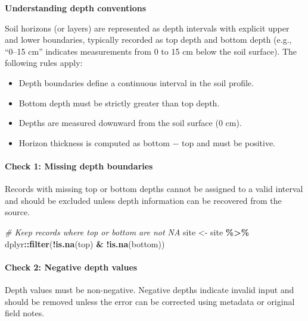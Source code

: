 \documentclass[
  10pt,
  b5paper,
  oneside]{book}
\newenvironment{Shaded}{\begin{snugshade}}{\end{snugshade}}
\newcommand{\CommentTok}[1]{\textcolor[rgb]{0.56,0.35,0.01}{\textit{#1}}}
\newcommand{\FunctionTok}[1]{\textcolor[rgb]{0.13,0.29,0.53}{\textbf{#1}}}
\newcommand{\NormalTok}[1]{#1}
\newcommand{\OtherTok}[1]{\textcolor[rgb]{0.56,0.35,0.01}{#1}}
\newcommand{\SpecialCharTok}[1]{\textcolor[rgb]{0.81,0.36,0.00}{\textbf{#1}}}
\begin{document}
\textbf{Understanding depth conventions}

Soil horizons (or layers) are represented as depth intervals with explicit upper and lower boundaries, typically recorded as top depth and bottom depth (e.g., ``0--15 cm'' indicates measurements from 0 to 15 cm below the soil surface). The following rules apply:

\begin{itemize}
\item
  Depth boundaries define a continuous interval in the soil profile.
\item
  Bottom depth must be strictly greater than top depth.
\item
  Depths are measured downward from the soil surface (0 cm).
\item
  Horizon thickness is computed as bottom − top and must be positive.
\end{itemize}

\paragraph*{Check 1: Missing depth boundaries}\label{check-1-missing-depth-boundaries}

Records with missing top or bottom depths cannot be assigned to a valid interval and should be excluded unless depth information can be recovered from the source.

\begin{Shaded}
\begin{Highlighting}[]
\CommentTok{\# Keep records where \textasciigrave{}top\textasciigrave{} or \textasciigrave{}bottom\textasciigrave{} are not NA}
\NormalTok{site }\OtherTok{\textless{}{-}}\NormalTok{ site }\SpecialCharTok{\%\textgreater{}\%}
\NormalTok{  dplyr}\SpecialCharTok{::}\FunctionTok{filter}\NormalTok{(}\SpecialCharTok{!}\FunctionTok{is.na}\NormalTok{(top) }\SpecialCharTok{\&} \SpecialCharTok{!}\FunctionTok{is.na}\NormalTok{(bottom))}
\end{Highlighting}
\end{Shaded}

\paragraph*{Check 2: Negative depth values}\label{check-2-negative-depth-values}

Depth values must be non-negative. Negative depths indicate invalid input and should be removed unless the error can be corrected using metadata or original field notes.
\end{document}
